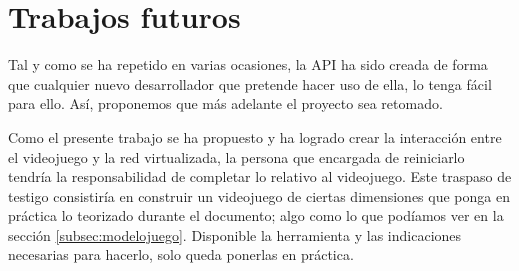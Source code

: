 \section{Trabajos futuros}
Tal y como se ha repetido en varias ocasiones, la API ha sido creada de forma que cualquier nuevo desarrollador que pretende hacer uso de ella, lo tenga fácil para ello. Así, proponemos que más adelante el proyecto sea retomado. 

Como el presente trabajo se ha propuesto y ha logrado crear la interacción entre el videojuego y la red virtualizada, la persona que encargada de reiniciarlo tendría la responsabilidad de completar lo relativo al videojuego. Este traspaso de testigo consistiría en construir un videojuego de ciertas dimensiones que ponga en práctica lo teorizado durante el documento; algo como lo que podíamos ver en la sección \ref{subsec:modelojuego}. Disponible la herramienta y las indicaciones necesarias para hacerlo, solo queda ponerlas en práctica.
